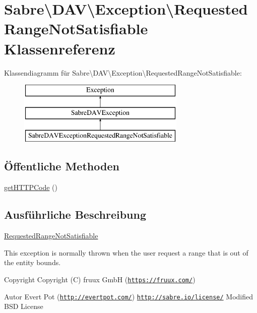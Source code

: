 \hypertarget{class_sabre_1_1_d_a_v_1_1_exception_1_1_requested_range_not_satisfiable}{}\section{Sabre\textbackslash{}D\+AV\textbackslash{}Exception\textbackslash{}Requested\+Range\+Not\+Satisfiable Klassenreferenz}
\label{class_sabre_1_1_d_a_v_1_1_exception_1_1_requested_range_not_satisfiable}
Klassendiagramm für Sabre\textbackslash{}D\+AV\textbackslash{}Exception\textbackslash{}Requested\+Range\+Not\+Satisfiable\+:\begin{figure}[H]
\begin{center}
\leavevmode
\includegraphics[height=3.000000cm]{class_sabre_1_1_d_a_v_1_1_exception_1_1_requested_range_not_satisfiable}
\end{center}
\end{figure}
\subsection*{Öffentliche Methoden}
\begin{DoxyCompactItemize}
\item 
\mbox{\hyperlink{class_sabre_1_1_d_a_v_1_1_exception_1_1_requested_range_not_satisfiable_a28a47a62dbb7c898163799bf5c49b3ac}{get\+H\+T\+T\+P\+Code}} ()
\end{DoxyCompactItemize}


\subsection{Ausführliche Beschreibung}
\mbox{\hyperlink{class_sabre_1_1_d_a_v_1_1_exception_1_1_requested_range_not_satisfiable}{Requested\+Range\+Not\+Satisfiable}}

This exception is normally thrown when the user request a range that is out of the entity bounds.

\begin{DoxyCopyright}{Copyright}
Copyright (C) fruux GmbH (\href{https://fruux.com/}{\tt https\+://fruux.\+com/}) 
\end{DoxyCopyright}
\begin{DoxyAuthor}{Autor}
Evert Pot (\href{http://evertpot.com/}{\tt http\+://evertpot.\+com/})  \href{http://sabre.io/license/}{\tt http\+://sabre.\+io/license/} Modified B\+SD License 
\end{DoxyAuthor}


